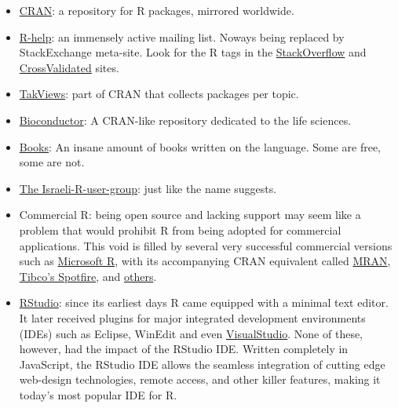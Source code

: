 \documentclass[]{book}
\theoremstyle{definition}
\theoremstyle{definition}
\theoremstyle{remark}
\begin{document}
\begin{itemize}
\item
  \href{https://cran.r-project.org/}{CRAN}: a repository for R packages,
  mirrored worldwide.
\item
  \href{https://www.r-project.org/mail.html}{R-help}: an immensely
  active mailing list. Noways being replaced by StackExchange meta-site.
  Look for the R tags in the
  \href{http://stackoverflow.com/}{StackOverflow} and
  \href{http://stats.stackexchange.com/}{CrossValidated} sites.
\item
  \href{https://cran.r-project.org/web/views/}{TakViews}: part of CRAN
  that collects packages per topic.
\item
  \href{https://www.bioconductor.org/}{Bioconductor}: A CRAN-like
  repository dedicated to the life sciences.
\item
  \href{https://www.r-project.org/doc/bib/R-books.html}{Books}: An
  insane amount of books written on the language. Some are free, some
  are not.
\item
  \href{https://groups.google.com/forum/\#!forum/israel-r-user-group}{The
  Israeli-R-user-group}: just like the name suggests.
\item
  Commercial R: being open source and lacking support may seem like a
  problem that would prohibit R from being adopted for commercial
  applications. This void is filled by several very successful
  commercial versions such as
  \href{https://mran.microsoft.com/open/}{Microsoft R}, with its
  accompanying CRAN equivalent called
  \href{https://mran.microsoft.com/}{MRAN},
  \href{http://spotfire.tibco.com/discover-spotfire/what-does-spotfire-do/predictive-analytics/tibco-enterprise-runtime-for-r-terr}{Tibco's
  Spotfire}, and
  \href{https://en.wikipedia.org/wiki/R_(programming_language)\#Commercial_support_for_R}{others}.
\item
  \href{https://www.rstudio.com/products/rstudio/download-server/}{RStudio}:
  since its earliest days R came equipped with a minimal text editor. It
  later received plugins for major integrated development environments
  (IDEs) such as Eclipse, WinEdit and even
  \href{https://www.visualstudio.com/vs/rtvs/}{VisualStudio}. None of
  these, however, had the impact of the RStudio IDE. Written completely
  in JavaScript, the RStudio IDE allows the seamless integration of
  cutting edge web-design technologies, remote access, and other killer
  features, making it today's most popular IDE for R.
\end{itemize}
\end{document}
